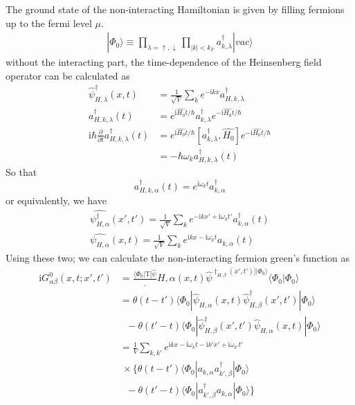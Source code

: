 ﻿\documentclass[twoside]{book}
\numberwithin{equation}{section}
\begin{document}
The ground state of the non-interacting Hamiltonian is given by filling fermions up to the fermi level $\mu$.
\begin{align}
|\Phi_0\rangle \equiv \prod_{\lambda=\uparrow,\downarrow}\prod_{|k|<k_F} a^{\dagger}_{k,\lambda}|vac\rangle \nonumber
\end{align}
without the interacting  part, the time-dependence of the Heinsenberg field operator can be calculated as
\begin{align}
\hat\psi^{\dagger}_{H,\lambda}(x,t)&=\frac{1}{\sqrt{V}}\sum_{k}e^{-\mathrm{i}kx}a_{H,k,\lambda}^{\dagger}\nonumber \\
a_{H,k,\lambda}^{\dagger}(t)&=e^{\mathrm{i}\hat{H_0}t/\hbar}a_{k,\lambda}^{\dagger}e^{-\mathrm{i}\hat{H_0}t/\hbar}\nonumber \\
\mathrm{i}\hbar \frac{\partial}{\partial  t} a_{H,k,\lambda}^{\dagger}(t)&=e^{\mathrm{i}\hat{H_0}t/\hbar}[a_{k,\lambda}^{\dagger},\hat{H_0}]e^{-\mathrm{i}\hat{H_0}t/\hbar}\nonumber \\
&=-\hbar \omega_k a_{H,k,\lambda}^{\dagger}(t) \nonumber
\end{align}
So that
\begin{equation}
a^{\dagger}_{H,k,\alpha}(t)=e^{\mathrm{i}\omega_{k}t}a^{\dagger}_{k,\alpha} \nonumber
\end{equation}
or equivalently, we have 
\begin{align}\label{2.3.5}
\hat{\psi_{H,\alpha}^{\dagger}}(x',t')=\frac{1}{\sqrt{V}}\sum_{k}e^{-\mathrm{i}kx'+\mathrm{i}\omega_kt'}a^{\dagger}_{k,\alpha}(t) \nonumber \\
\hat{\psi_{H,\alpha}}(x,t)=\frac{1}{\sqrt{V}}\sum_{k}e^{\mathrm{i}kx-\mathrm{i}\omega_kt}a_{k,\alpha}(t)
\end{align}
Using these two; we can calculate the non-interacting fermion green's function as
\begin{align}
\mathrm{i}G^0_{\alpha\beta}(x,t;x',t')&=\frac{\langle\Phi_0|\mathrm{T}[\hat \psi}_{H,\alpha}(x,t)\hat \psi^{\dagger_{H,\beta} (x',t')]|\Phi_0\rangle}{\langle\Phi_0|\Phi_0\rangle} \nonumber \\
&=\theta(t-t')\langle\Phi_0|\hat \psi_{H,\alpha}(x,t)\hat \psi^{
\dagger}_{H,\beta} (x',t')|\Phi_0\rangle \nonumber \\
& \ \ \ -\theta(t'-t)\langle\Phi_0|\hat \psi^{
\dagger}_{H,\beta}(x',t')\hat \psi_{H,\alpha} (x,t)|\Phi_0\rangle \nonumber \\
&=\frac{1}{V}\sum_{k,k'}e^{\mathrm{i}kx-\mathrm{i}\omega_kt-\mathrm{i}k'x'+\mathrm{i}\omega_{k'}t'} \nonumber \\
&\  \times\{\theta(t-t')\langle\Phi_0|a_{k,\alpha}a^{\dagger}_{k',\beta}|\Phi_0\rangle \nonumber \\
& \ \ \ -\theta(t'-t)\langle\Phi_0|a^{\dagger}_{k',\beta}a_{k,\alpha}|\Phi_0\rangle \} \nonumber 
\end{align}
\end{document}
